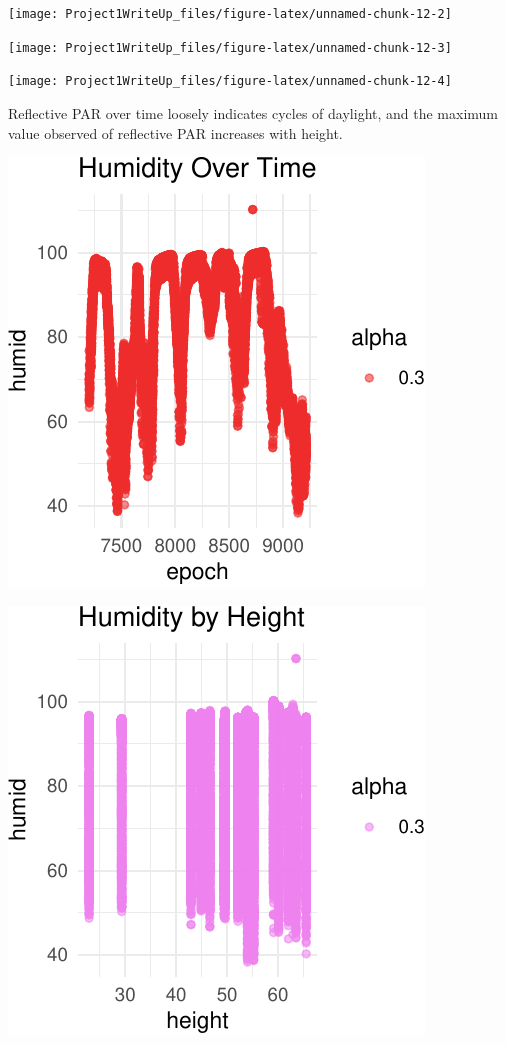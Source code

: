 \documentclass[]{article}
\begin{document}
\begin{center}\texttt{[image: Project1WriteUp\_files/figure-latex/unnamed-chunk-12-2]} \end{center}

\begin{center}\texttt{[image: Project1WriteUp\_files/figure-latex/unnamed-chunk-12-3]} \end{center}

\begin{center}\texttt{[image: Project1WriteUp\_files/figure-latex/unnamed-chunk-12-4]} \end{center}

Reflective PAR over time loosely indicates cycles of daylight, and the
maximum value observed of reflective PAR increases with height.

\begin{center}\includegraphics{Project1WriteUp_files/figure-latex/unnamed-chunk-13-1} \end{center}

\begin{center}\includegraphics{Project1WriteUp_files/figure-latex/unnamed-chunk-13-2} \end{center}
\end{document}
